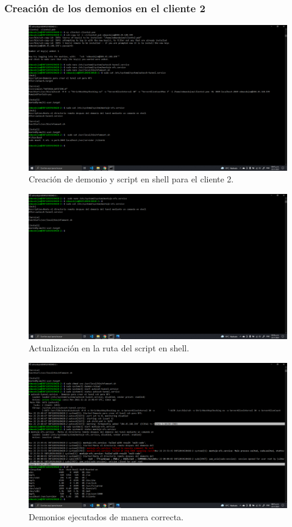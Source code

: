 \documentclass[11pt]{article}
\begin{document}
		\subsubsection{Creación de los demonios en el cliente 2 }
		\begin{figure}[H]
			\centering
			\includegraphics[scale=0.34]{resources/demonioc2.png}
			\caption{Creación de demonio y script en shell para el cliente 2.}\label{fig:picture}
		\end{figure}
		\begin{figure}[H]
			\centering
			\includegraphics[scale=0.34]{resources/demonioc2actu.png}
			\caption{Actualización en la ruta del script en shell.}\label{fig:picture}
		\end{figure}
		 \begin{figure}[H]
			\centering
			\includegraphics[scale=0.34]{resources/demoniosonc2.png}
			\caption{Demonios ejecutados de manera correcta.}\label{fig:picture}
		\end{figure}
		
\end{document}
